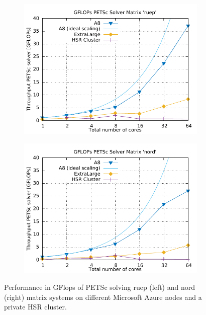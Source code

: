 \documentclass[3p,times]{elsarticle}
\begin{document}
\begin{figure}[ht]
\begin{subfigure}{.33\textwidth}
	\label{fig:hpcg}
\end{subfigure}
\begin{subfigure}{.33\textwidth}
  \centering
	\includegraphics[width=\linewidth]{gplt-gflops-ruep}  
  \label{fig:ruepel}
\end{subfigure}%
\begin{subfigure}{.33\textwidth}
  \centering
  \includegraphics[width=\linewidth]{gplt-gflops-nord}
  \label{fig:nord}
\end{subfigure}

\caption{Performance in GFlops of PETSc solving ruep (left) and nord (right) matrix systems on different Microsoft Azure nodes and a private HSR cluster. }
\label{fig:test}
\end{figure}
\end{document}
